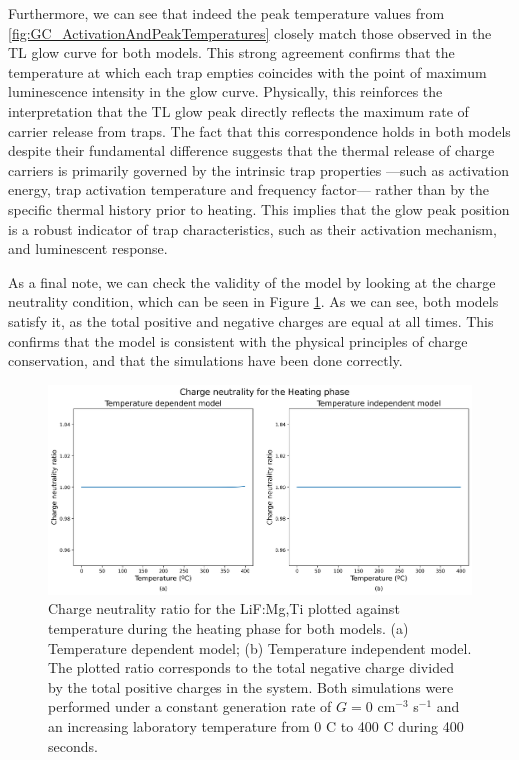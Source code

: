 \vspace{10pt}

Furthermore, we can see that indeed the peak temperature values from \ref{fig:GC_ActivationAndPeakTemperatures} closely match those observed in the TL glow curve for both models. This strong agreement confirms that the temperature at which each trap empties coincides with the point of maximum luminescence intensity in the glow curve. Physically, this reinforces the interpretation that the TL glow peak directly reflects the maximum rate of carrier release from traps. The fact that this correspondence holds in both models despite their fundamental difference suggests that the thermal release of charge carriers is primarily governed by the intrinsic trap properties ---such as activation energy, trap activation temperature and frequency factor--- rather than by the specific thermal history prior to heating. This implies that the glow peak position is a robust indicator of trap characteristics, such as their activation mechanism, and luminescent response. 

\vspace{10pt}

As a final note, we can check the validity of the model by looking at the charge neutrality condition, which can be seen in Figure \ref{fig:heating_chneutrality}. As we can see, both models satisfy it, as the total positive and negative charges are equal at all times. This confirms that the model is consistent with the physical principles of charge conservation, and that the simulations have been done correctly.

\begin{figure}
    \centering
    \includegraphics[width=\textwidth]{Images/Heating Charge neutrality.png}
    \caption[Charge neutrality ratio evolution during the heating phase for both models.]{Charge neutrality ratio for the LiF:Mg,Ti plotted against temperature during the heating phase for both models. (a) Temperature dependent model; (b) Temperature independent model. The plotted ratio corresponds to the total negative charge divided by the total positive charges in the system. Both simulations were performed under a constant generation rate of $G = 0$ cm$^{-3}$ s$^{-1}$ and an increasing laboratory temperature from 0 \textdegree C to 400 \textdegree C during 400 seconds.}
    \label{fig:heating_chneutrality}
\end{figure}